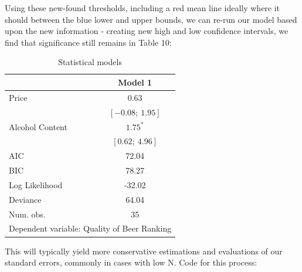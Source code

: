 \documentclass[12pt]{article}\usepackage[]{graphicx}\usepackage[]{color}
\begin{document}
\begin{flushleft}
Using these new-found thresholds, including a red mean line ideally where it should between the blue lower and upper bounds, we can re-run our model based upon the new information - creating new high and low confidence intervals, we find that significance still remains in Table 10: \\

\begin{table}[h!]
\caption{Statistical models}
\begin{center}
\begin{tabular}{l c }
\hline
 & Model 1 \\
\hline
Price           & $0.63$           \\
                & $[-0.08;\ 1.95]$ \\
Alcohol Content & $1.75^{*}$       \\
                & $[0.62;\ 4.96]$  \\
\hline
AIC             & 72.04            \\
BIC             & 78.27            \\
Log Likelihood  & -32.02           \\
Deviance        & 64.04            \\
Num. obs.       & 35               \\
\hline
\multicolumn{2}{l}{\scriptsize{Dependent variable: Quality of Beer Ranking}}
\end{tabular}
\end{center}
\end{table}


This will typically yield more conservative estimations and evaluations of our standard errors, commonly in cases with low N. Code for this process:


\end{flushleft}
\end{document}
